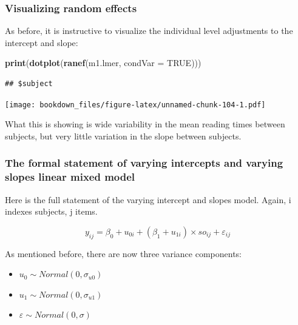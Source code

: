 \documentclass[12pt,]{krantz}
\newenvironment{Shaded}{\begin{snugshade}}{\end{snugshade}}
\newcommand{\DataTypeTok}[1]{\textcolor[rgb]{0.13,0.29,0.53}{#1}}
\newcommand{\KeywordTok}[1]{\textcolor[rgb]{0.13,0.29,0.53}{\textbf{#1}}}
\newcommand{\NormalTok}[1]{#1}
\newcommand{\OtherTok}[1]{\textcolor[rgb]{0.56,0.35,0.01}{#1}}
\providecommand{\tightlist}{%
  \setlength{\itemsep}{0pt}\setlength{\parskip}{0pt}}
\begin{document}
\hypertarget{visualizing-random-effects}{%
\subsubsection{Visualizing random effects}\label{visualizing-random-effects}}

As before, it is instructive to visualize the individual level adjustments to the intercept and slope:

\begin{Shaded}
\begin{Highlighting}[]
\KeywordTok{print}\NormalTok{(}\KeywordTok{dotplot}\NormalTok{(}\KeywordTok{ranef}\NormalTok{(m1.lmer, }\DataTypeTok{condVar =} \OtherTok{TRUE}\NormalTok{)))}
\end{Highlighting}
\end{Shaded}

\begin{verbatim}
## $subject
\end{verbatim}

\texttt{[image: bookdown\_files/figure-latex/unnamed-chunk-104-1.pdf]}

What this is showing is wide variability in the mean reading times between subjects, but very little variation in the slope between subjects.

\hypertarget{the-formal-statement-of-varying-intercepts-and-varying-slopes-linear-mixed-model}{%
\subsubsection{The formal statement of varying intercepts and varying slopes linear mixed model}\label{the-formal-statement-of-varying-intercepts-and-varying-slopes-linear-mixed-model}}

Here is the full statement of the varying intercept and slopes model. Again, i indexes subjects, j items.

\begin{equation}
y_{ij} = \beta_0 + u_{0i}+(\beta_1+u_{1i})\times so_{ij} + \varepsilon_{ij}
\end{equation}

As mentioned before, there are now three variance components:

\begin{itemize}
\tightlist
\item
  \(u_0 \sim Normal(0,\sigma_{u0})\)
\item
  \(u_1 \sim Normal(0,\sigma_{u1})\)
\item
  \(\varepsilon \sim Normal(0,\sigma)\)
\end{itemize}
\end{document}
